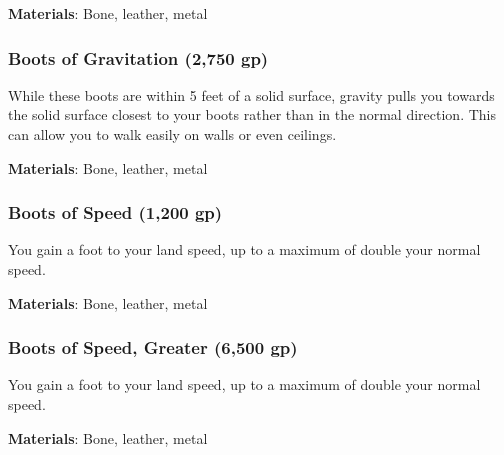 \vspace{0.25em}
\textbf{Materials}: Bone, leather, metal


\lowercase{\hypertarget{item:Boots of Gravitation}{}}\label{item:Boots of Gravitation}
\hypertarget{item:Boots of Gravitation}{\subsubsection{Boots of Gravitation\hfill{} (2,750 gp)}}

While these boots are within 5 feet of a solid surface, gravity pulls you towards the solid surface closest to your boots rather than in the normal direction.
This can allow you to walk easily on walls or even ceilings.



\vspace{0.25em}
\textbf{Materials}: Bone, leather, metal


\lowercase{\hypertarget{item:Boots of Speed}{}}\label{item:Boots of Speed}
\hypertarget{item:Boots of Speed}{\subsubsection{Boots of Speed\hfill{} (1,200 gp)}}

You gain a  foot  to your land speed, up to a maximum of double your normal speed.



\vspace{0.25em}
\textbf{Materials}: Bone, leather, metal


\lowercase{\hypertarget{item:Boots of Speed, Greater}{}}\label{item:Boots of Speed, Greater}
\hypertarget{item:Boots of Speed, Greater}{\subsubsection{Boots of Speed, Greater\hfill{} (6,500 gp)}}

You gain a  foot  to your land speed, up to a maximum of double your normal speed.



\vspace{0.25em}
\textbf{Materials}: Bone, leather, metal


